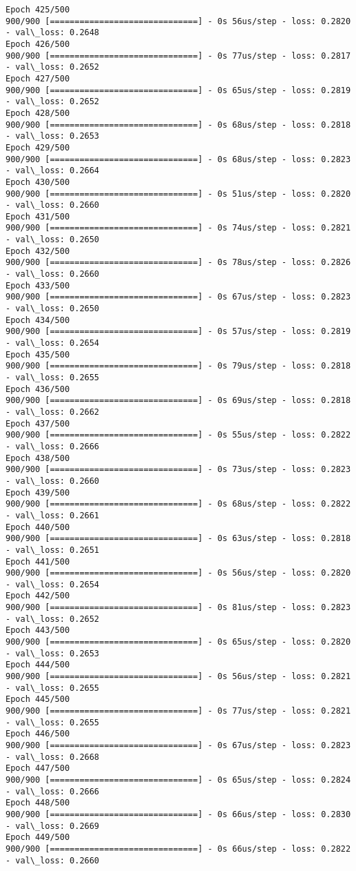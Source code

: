 \documentclass[11pt]{article}
\begin{document}
\begin{Verbatim}[commandchars=\\\{\}]
Epoch 425/500
900/900 [==============================] - 0s 56us/step - loss: 0.2820 - val\_loss: 0.2648
Epoch 426/500
900/900 [==============================] - 0s 77us/step - loss: 0.2817 - val\_loss: 0.2652
Epoch 427/500
900/900 [==============================] - 0s 65us/step - loss: 0.2819 - val\_loss: 0.2652
Epoch 428/500
900/900 [==============================] - 0s 68us/step - loss: 0.2818 - val\_loss: 0.2653
Epoch 429/500
900/900 [==============================] - 0s 68us/step - loss: 0.2823 - val\_loss: 0.2664
Epoch 430/500
900/900 [==============================] - 0s 51us/step - loss: 0.2820 - val\_loss: 0.2660
Epoch 431/500
900/900 [==============================] - 0s 74us/step - loss: 0.2821 - val\_loss: 0.2650
Epoch 432/500
900/900 [==============================] - 0s 78us/step - loss: 0.2826 - val\_loss: 0.2660
Epoch 433/500
900/900 [==============================] - 0s 67us/step - loss: 0.2823 - val\_loss: 0.2650
Epoch 434/500
900/900 [==============================] - 0s 57us/step - loss: 0.2819 - val\_loss: 0.2654
Epoch 435/500
900/900 [==============================] - 0s 79us/step - loss: 0.2818 - val\_loss: 0.2655
Epoch 436/500
900/900 [==============================] - 0s 69us/step - loss: 0.2818 - val\_loss: 0.2662
Epoch 437/500
900/900 [==============================] - 0s 55us/step - loss: 0.2822 - val\_loss: 0.2666
Epoch 438/500
900/900 [==============================] - 0s 73us/step - loss: 0.2823 - val\_loss: 0.2660
Epoch 439/500
900/900 [==============================] - 0s 68us/step - loss: 0.2822 - val\_loss: 0.2661
Epoch 440/500
900/900 [==============================] - 0s 63us/step - loss: 0.2818 - val\_loss: 0.2651
Epoch 441/500
900/900 [==============================] - 0s 56us/step - loss: 0.2820 - val\_loss: 0.2654
Epoch 442/500
900/900 [==============================] - 0s 81us/step - loss: 0.2823 - val\_loss: 0.2652
Epoch 443/500
900/900 [==============================] - 0s 65us/step - loss: 0.2820 - val\_loss: 0.2653
Epoch 444/500
900/900 [==============================] - 0s 56us/step - loss: 0.2821 - val\_loss: 0.2655
Epoch 445/500
900/900 [==============================] - 0s 77us/step - loss: 0.2821 - val\_loss: 0.2655
Epoch 446/500
900/900 [==============================] - 0s 67us/step - loss: 0.2823 - val\_loss: 0.2668
Epoch 447/500
900/900 [==============================] - 0s 65us/step - loss: 0.2824 - val\_loss: 0.2666
Epoch 448/500
900/900 [==============================] - 0s 66us/step - loss: 0.2830 - val\_loss: 0.2669
Epoch 449/500
900/900 [==============================] - 0s 66us/step - loss: 0.2822 - val\_loss: 0.2660

\end{Verbatim}
\end{document}
